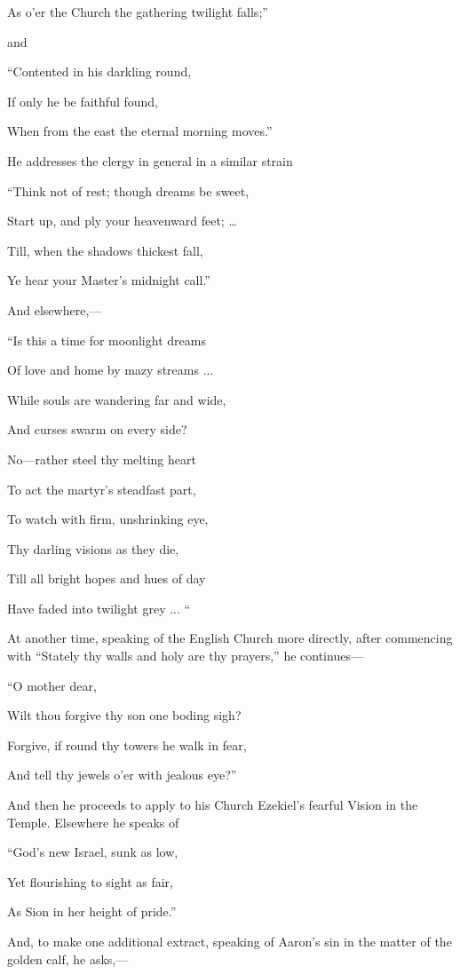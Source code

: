 As o'er the Church the gathering twilight falls;''

and

``Contented
in his darkling round,

If
only he be faithful found,

When from the east the eternal morning moves.''

He addresses the clergy in general in a similar
strain

``Think
not of rest; though dreams be sweet,

Start up, and ply your heavenward feet; …

Till, when the shadows thickest fall,

Ye hear your Master's midnight call.''

And elsewhere,—

``Is this
a time for moonlight dreams

Of love and home by mazy streams ...

While souls are wandering far and wide,

And curses swarm on every side?

No—rather steel thy melting heart

To act the martyr's steadfast part,

To watch with firm, unshrinking eye,

Thy darling visions as they die,

Till all bright hopes and hues of day

Have faded into twilight grey ... ``

At another time, speaking of the English Church
more directly, after commencing with ``Stately thy walls and holy are
thy prayers,'' he continues—

``O mother dear,

Wilt thou forgive thy son one boding sigh?

Forgive, if round thy towers he walk in fear,

And tell thy jewels o'er with jealous eye?''

And then he proceeds to apply to his Church
Ezekiel's fearful Vision in the Temple. Elsewhere he speaks of

``God's
new Israel, sunk as low,

Yet flourishing to sight as fair,

As Sion in her height of pride.''

And, to make one additional extract, speaking of
Aaron's sin in the matter of the golden calf, he asks,—

